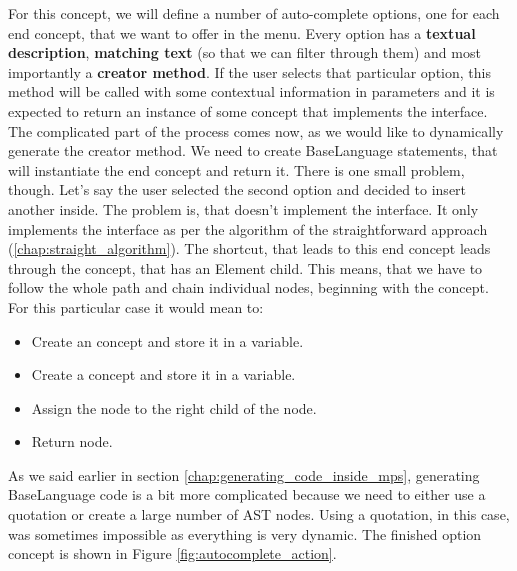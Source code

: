 For this concept, we will define a number of auto-complete options, one for each end concept, that we want to offer in the menu.
Every option has a \textbf{textual description}, \textbf{matching text} (so that we can filter through them) and most importantly a \textbf{creator method}.
If the user selects that particular option, this method will be called with some contextual information in parameters and it is expected to return an instance of some concept that implements the  interface.
\\

The complicated part of the process comes now, as we would like to dynamically generate the creator method.
We need to create BaseLanguage statements, that will instantiate the end concept and return it.
There is one small problem, though.
Let's say the user selected the second option and decided to insert another  inside.
The problem is, that  doesn't implement the  interface.
It only implements the  interface as per the algorithm of the straightforward approach (\ref{chap:straight_algorithm}).
The shortcut, that leads to this end concept leads through the  concept, that has an Element child.
This means, that we have to follow the whole path and chain individual nodes, beginning with the  concept.
For this particular case it would mean to:

\begin{itemize}
	\item Create an  concept and store it in a variable.

	\item Create a  concept and store it in a variable.

	\item Assign the  node to the right child of the  node.

	\item Return  node.
\end{itemize}

As we said earlier in section \ref{chap:generating_code_inside_mps}, generating BaseLanguage code is a bit more complicated because we need to either use a quotation or create a large number of AST nodes.
Using a quotation, in this case, was sometimes impossible as everything is very dynamic.
The finished option concept is shown in Figure \ref{fig:autocomplete_action}.

